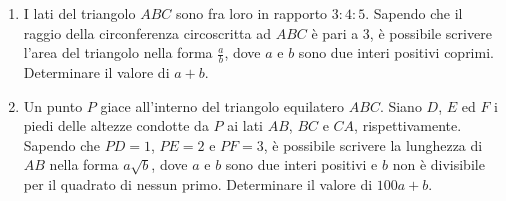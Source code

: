 \documentclass{article}
\begin{document}
\begin{enumerate}
	\item I lati del triangolo $ABC$ sono fra loro in rapporto $3:4:5$.
		Sapendo che il raggio della circonferenza circoscritta ad $ABC$
		è pari a 3, è possibile scrivere l'area del triangolo nella forma
		$\frac{a}{b}$, dove $a$ e $b$ sono due interi positivi coprimi.
		Determinare il valore di $a+b$.

	\item Un punto $P$ giace all'interno del triangolo equilatero $ABC$.
		Siano $D$, $E$ ed $F$ i piedi delle altezze condotte da $P$
		ai lati $AB$, $BC$ e $CA$, rispettivamente. Sapendo che $PD=1$,
		$PE=2$ e $PF=3$, è possibile scrivere la lunghezza di $AB$ nella
		forma $a\sqrt{b}$, dove $a$ e $b$ sono due interi positivi e
		$b$ non è divisibile per il quadrato di nessun primo. Determinare
		il valore di $100a+b$.

\end{enumerate}
\end{document}
